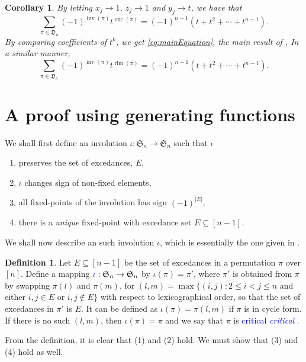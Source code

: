 \documentclass[reqno]{amsart}
\newtheorem{corollary}[theorem]{Corollary}
\theoremstyle{definition}
\newtheorem{definition}[theorem]{Definition}
\newcommand{\defin}[1]{%
\relax\ifmmode%
\textcolor{blue}{#1}%
\else\textcolor{blue}{\emph{#1}}%
\fi%
}
\newcommand{\symS}{\mathfrak{S}}
\newcommand{\dArr}{\mathfrak{D}}
\DeclareMathOperator{\inv}{inv}
\DeclareMathOperator{\exc}{exc}
\DeclareMathOperator{\rlm}{rlm}
\begin{document}
\begin{corollary}
By letting $x_j \to 1$, $z_j \to 1$ and $y_j \to t$, we have that 
\begin{equation}
 \sum_{\pi \in \dArr_n} (-1)^{\inv(\pi)} t^{\exc(\pi)}
 =
 (-1)^{n-1}(t+t^2+\dotsb+t^{n-1}).
 \end{equation}
By comparing coefficients of $t^k$,
we get \eqref{eq:mainEquation}, the main result of \cite{MantaciRakotondrajao2003}, 
%
In a similar manner,
\begin{equation}
\sum_{\pi \in \dArr_n} (-1)^{\inv(\pi)} t^{\rlm(\pi)}
 =
 (-1)^{n-1}(t+t^2+\dotsb+t^{n-1}).
\end{equation}
\end{corollary}


\section{A proof using generating functions}\label{sec:genFunc}


We shall first define an involution
$\iota:\symS_n \to \symS_n$ such that $\iota$
\begin{enumerate}
 \item preserves the set of excedances, $E$,
 \item $\iota$ changes sign of non-fixed elements,
 \item all fixed-points of the involution has sign $(-1)^{|E|}$,
 \item there is a \emph{unique} fixed-point with excedance set $E \subseteq [n-1]$.
\end{enumerate}
%
We shall now describe an such involution $\iota$,
which is essentially the one given in \cite{Mantaci1993}.


\begin{definition}
Let $E\subseteq [n-1]$ be the set of excedances in a permutation $\pi$ over $[n]$. 
Define a mapping $\defin{\iota}: \symS_n \rightarrow \symS_n$ by 
$\iota(\pi)=\pi'$,
where $\pi'$ is obtained from $\pi$ by swapping $\pi(l)$ and $\pi(m)$,
for $(l,m)=\max\{(i,j): 2\leq i<j\leq n$ and either $i, j\in E$ or $i,j\notin E\}$ 
with respect to lexicographical order, so that the set of excedances in $\pi'$ is $E$. 
It can be defined as $\iota(\pi)=\pi (l,m)$ if $\pi$ is in cycle form.
If there is no such $(l,m)$, then $\iota(\pi)=\pi$ and we say that $\pi$ is \defin{critical}.
\end{definition}
From the definition, it is clear that (1) and (2) hold.
We must show that (3) and (4) hold as well.
\end{document}
